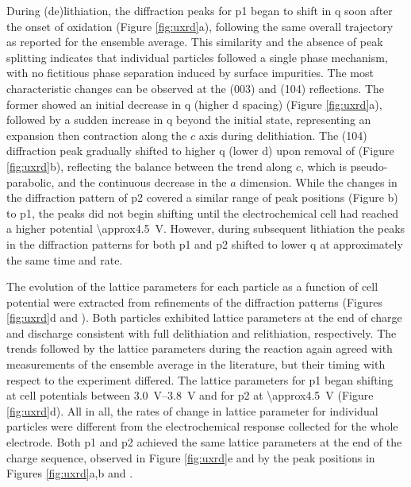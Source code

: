\documentclass{WileyMSP-template}
\begin{document}
During (de)lithiation, the diffraction peaks for \gls{p1} began to
shift in \gls{q} soon after the onset of oxidation (Figure
\ref{fig:uxrd}a), following the same overall trajectory as reported
for the ensemble average\cite{robert2015}. This similarity and the
absence of peak splitting indicates that individual particles followed
a single phase mechanism, with no fictitious phase separation induced
by surface impurities\cite{grenier2017}. The most characteristic
changes can be observed at the (003) and (104) reflections. The former
showed an initial decrease in \gls{q} (higher d spacing) (Figure
\ref{fig:uxrd}a), followed by a sudden increase in \gls{q} beyond the
initial state, representing an expansion then contraction along the
$c$ axis during delithiation\cite{robert2015}. The (104) diffraction
peak gradually shifted to higher \gls{q} (lower d) upon removal of
 (Figure \ref{fig:uxrd}b), reflecting the balance between the
trend along $c$, which is pseudo-parabolic, and the continuous
decrease in the $a$ dimension.\cite{robert2015} While the changes in
the diffraction pattern of \gls{p2} covered a similar range of peak
positions (Figure b) to \gls{p1}, the peaks did
not begin shifting until the electrochemical cell had reached a higher
potential \SI{\approx4.5}{\volt}. However, during subsequent
lithiation the peaks in the diffraction patterns for both \gls{p1} and
\gls{p2} shifted to lower \gls{q} at approximately the same time and
rate.

The evolution of the lattice parameters for each particle as a
function of cell potential were extracted from refinements of the
diffraction patterns (Figures \ref{fig:uxrd}d and
). Both particles exhibited lattice parameters
at the end of charge and discharge consistent with full delithiation
and relithiation, respectively\cite{novak2015}. The trends followed by
the lattice parameters during the reaction again agreed with
measurements of the ensemble average in the literature\cite{novak2015,
  faenza2018}, but their timing with respect to the experiment
differed. The lattice parameters for \gls{p1} began shifting at cell
potentials between \SIrange{3.0}{3.8}{\volt} and for \gls{p2} at
\SI{\approx4.5}{\volt} (Figure \ref{fig:uxrd}d). All in all, the rates
of change in lattice parameter for individual particles were different
from the electrochemical response collected for the whole
electrode. Both \gls{p1} and \gls{p2} achieved the same lattice
parameters at the end of the charge sequence, observed in Figure
\ref{fig:uxrd}e and by the peak positions in Figures \ref{fig:uxrd}a,b
and .
\end{document}

